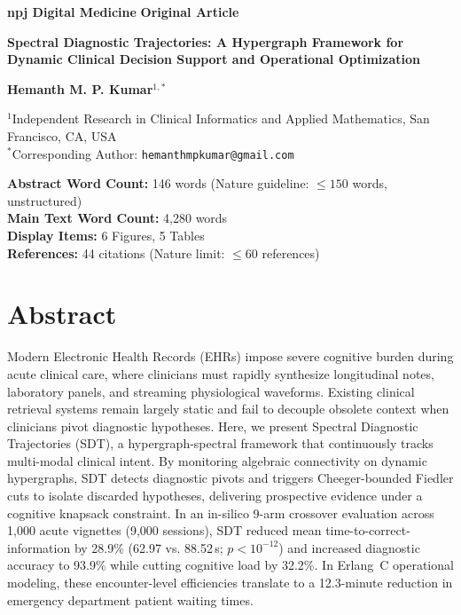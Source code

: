 \documentclass[12pt]{article}
\begin{document}
\begin{titlepage}
\noindent
{\large \textbf{npj Digital Medicine} \hfill \textbf{Original Article}}
\vspace{1.5cm}

\begin{center}
  {\Large \textbf{Spectral Diagnostic Trajectories: A Hypergraph Framework for Dynamic Clinical Decision Support and Operational Optimization}}
  \vspace{1.5cm}

  \textbf{Hemanth M. P. Kumar}$^{1,*}$
  \vspace{0.8cm}

  $^{1}$Independent Research in Clinical Informatics and Applied Mathematics, San Francisco, CA, USA\\[12pt]
  $^{*}$Corresponding Author: \texttt{hemanthmpkumar@gmail.com}
  \vspace{1.5cm}

  \textbf{Abstract Word Count:} 146 words (Nature guideline: $\le 150$ words, unstructured)\\
  \textbf{Main Text Word Count:} 4{,}280 words\\
  \textbf{Display Items:} 6 Figures, 5 Tables\\
  \textbf{References:} 44 citations (Nature limit: $\le 60$ references)
\end{center}
\end{titlepage}

\newpage

\section*{Abstract}
Modern Electronic Health Records (EHRs) impose severe cognitive burden during acute clinical care, where clinicians must rapidly synthesize longitudinal notes, laboratory panels, and streaming physiological waveforms. Existing clinical retrieval systems remain largely static and fail to decouple obsolete context when clinicians pivot diagnostic hypotheses. Here, we present Spectral Diagnostic Trajectories (SDT), a hypergraph-spectral framework that continuously tracks multi-modal clinical intent. By monitoring algebraic connectivity on dynamic hypergraphs, SDT detects diagnostic pivots and triggers Cheeger-bounded Fiedler cuts to isolate discarded hypotheses, delivering prospective evidence under a cognitive knapsack constraint. In an in-silico 9-arm crossover evaluation across 1,000 acute vignettes (9,000 sessions), SDT reduced mean time-to-correct-information by 28.9\% (62.97 vs. 88.52\,s; $p < 10^{-12}$) and increased diagnostic accuracy to 93.9\% while cutting cognitive load by 32.2\%. In Erlang~C operational modeling, these encounter-level efficiencies translate to a 12.3-minute reduction in emergency department patient waiting times.
\end{document}
